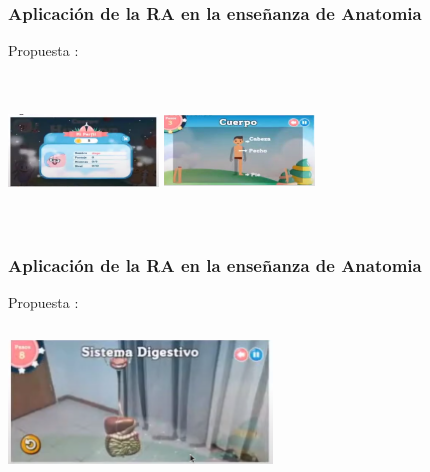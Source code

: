 \documentclass[11pt]{beamer}
\begin{document}
\begin{frame}
\frametitle{Aplicación de la RA en la enseñanza de Anatomia}
\center Propuesta : 
\center
\begin{itemize}
\end{itemize}
\includegraphics[width=4cm, height=4cm]{img/perfil.png}
\includegraphics[width=4cm, height=4cm]{img/cuerpo.png}
\end{frame}



\begin{frame}
\frametitle{Aplicación de la RA en la enseñanza de Anatomia}
\center Propuesta : 
\center
\begin{itemize}
\end{itemize}
\includegraphics[width=7cm, height=4cm]{img/sistema_digestivo.png}
\end{frame}
\end{document}
